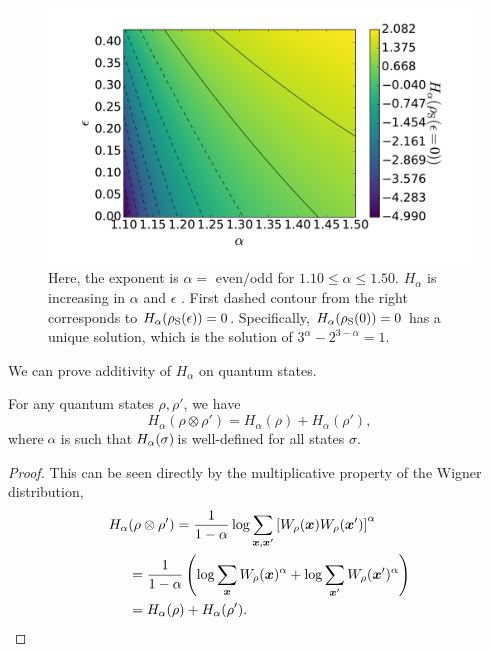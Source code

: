 \documentclass[pra,
aps,
twocolumn,
superscriptaddress,
groupedaddress,
nofootinbib,
reprint
]{revtex4-1}
\begin{document}
\begin{figure}[h]
    \centering
    \includegraphics[scale=0.35]{figs/test/H_vs_eps_a.pdf}
    \caption{\ddd{[TO DO: Set $\epsilon = 0$ and determine region of $\alpha$ such that $H <0$.]} Here, the exponent is $\alpha =$ even$/$odd for $1.10 \leq \alpha \leq 1.50$. $H_\alpha$ is increasing in $\alpha$ and $\epsilon$ . First dashed contour from the right corresponds to $H_\alpha(\rho_{\rm{S}}(\epsilon)) = 0$. Specifically, $H_\alpha(\rho_{\rm{S}}(0)) = 0$ has a unique solution, which is the  solution of $3^\alpha - 2^{3-\alpha} = 1$.
    }
    \label{fig:lcs}
\end{figure}

We can prove additivity of $H_{\alpha}$ on quantum states.

\begin{lemma}\label{H_add}
	For any quantum states $\rho, \rho'$, we have
	\begin{equation}
		H_{\alpha}(\rho \otimes \rho') = H_{\alpha}(\rho) + H_{\alpha}(\rho'),
	\end{equation}
	where $\hspace{-1pt}\alpha\hspace{-1pt}$ is such that $\hspace{-1pt}H_\alpha(\sigma)\hspace{-2pt}$ is well-defined for all states $\sigma$.
\end{lemma}
\begin{proof}
	This can be seen directly by the multiplicative property of the Wigner distribution,
	\begin{align*}
		H_{\alpha}&(\rho \otimes \rho') = \frac{1}{1-\alpha}\log \sum_{\bm{x},\bm{x}'} \left[W_{\rho}(\bm{x})W_{\rho}(\bm{x}')\right]^{\alpha} \\
		&= \frac{1}{1-\alpha}\left( \log \sum_{\bm{x}}W_{\rho}(\bm{x})^{\alpha} + \log \sum_{\bm{x}'}W_{\rho}(\bm{x}')^{\alpha} \right) \\
		&= H_{\alpha}(\rho) + H_{\alpha}(\rho').
	\end{align*}
\end{proof}
\end{document}
